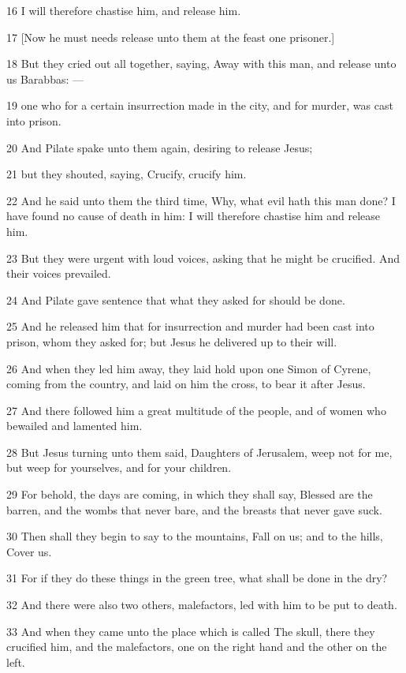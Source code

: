 \par 16 I will therefore chastise him, and release him.
\par 17 [Now he must needs release unto them at the feast one prisoner.]
\par 18 But they cried out all together, saying, Away with this man, and release unto us Barabbas: —
\par 19 one who for a certain insurrection made in the city, and for murder, was cast into prison.
\par 20 And Pilate spake unto them again, desiring to release Jesus;
\par 21 but they shouted, saying, Crucify, crucify him.
\par 22 And he said unto them the third time, Why, what evil hath this man done? I have found no cause of death in him: I will therefore chastise him and release him.
\par 23 But they were urgent with loud voices, asking that he might be crucified. And their voices prevailed.
\par 24 And Pilate gave sentence that what they asked for should be done.
\par 25 And he released him that for insurrection and murder had been cast into prison, whom they asked for; but Jesus he delivered up to their will.
\par 26 And when they led him away, they laid hold upon one Simon of Cyrene, coming from the country, and laid on him the cross, to bear it after Jesus.
\par 27 And there followed him a great multitude of the people, and of women who bewailed and lamented him.
\par 28 But Jesus turning unto them said, Daughters of Jerusalem, weep not for me, but weep for yourselves, and for your children.
\par 29 For behold, the days are coming, in which they shall say, Blessed are the barren, and the wombs that never bare, and the breasts that never gave suck.
\par 30 Then shall they begin to say to the mountains, Fall on us; and to the hills, Cover us.
\par 31 For if they do these things in the green tree, what shall be done in the dry?
\par 32 And there were also two others, malefactors, led with him to be put to death.
\par 33 And when they came unto the place which is called The skull, there they crucified him, and the malefactors, one on the right hand and the other on the left.
